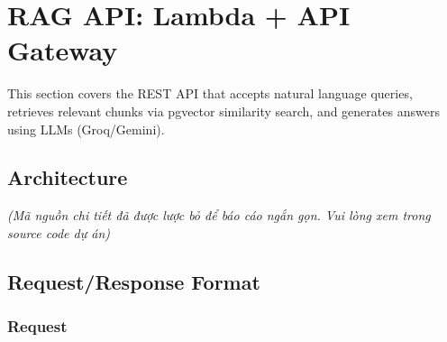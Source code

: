 \hypertarget{rag-api-lambda-api-gateway}{%
\section{RAG API: Lambda + API
Gateway}}

This section covers the REST API that accepts natural language queries,
retrieves relevant chunks via pgvector similarity search, and generates
answers using LLMs (Groq/Gemini).

\hypertarget{architecture}{%
\subsection{Architecture}}

\emph{(Mã nguồn chi tiết đã được lược bỏ để báo cáo ngắn gọn. Vui lòng
xem trong source code dự án)}

\hypertarget{requestresponse-format}{%
\subsection{Request/Response Format}}

\hypertarget{request}{%
\subsubsection{Request}}

\begin{Shaded}
\begin{Highlighting}[]
 
 

\FunctionTok{\{}
  \FunctionTok{:} \FunctionTok{,}
  \FunctionTok{:} \FunctionTok{,}      \ErrorTok{//} \FunctionTok{:} \FunctionTok{,} \FunctionTok{,} 
  \FunctionTok{:} \FunctionTok{,}                        \ErrorTok{//} \FunctionTok{:}  
  \ErrorTok{:}                 \ErrorTok{//}   \ErrorTok{=}   \FunctionTok{,}  
\FunctionTok{\}}
\end{Highlighting}
\end{Shaded}

